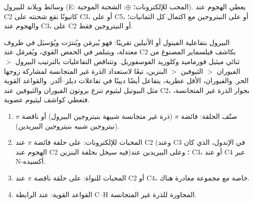\begin{omfigure}

{\small وسائط ويلاند للبيرول (E: المحب للإلكترونات؛ $\oplus$: الشحنة الموجبة).
يعطي الهجوم عند C2 كاتيونًا تقع شحنته على C3، أو على C5، أو على النيتروجين مع اكتمال كل
الثمانيات؛ والهجوم عند C3، على C2 أو النيتروجين فقط.}
\end{omfigure}

البيرول بتفاعلية الفينول أو الأنيلين تقريبًا: فهو يُبرمَن ويُنترَت
ويُؤسيَل في ظروف معتدلة، ويتبلمر في الحمض القوي، 
ويُفرمَل عند C2 بكاشف فيلسماير المصنوع من ثنائي ميثيل فورماميد وكلوريد
الفوسفوريل. وتتناقص التفاعليات بالترتيب البيرول $>$ الفيوران $>$ الثيوفين $>$ البنزين،
تبعًا لاستعداد الذرة غير المتجانسة لمشاركة زوجها الحر. والفيوران،
الأقل عطرية، يتفاعل أيضًا ديينًا في تفاعلات ديلز--ألدر. والقواعد
القوية مثل البيوتيل ليثيوم تنزع بروتون الفيوران والثيوفين عند C2، بجوار
الذرة غير المتجانسة، فتعطي كواشف ليثيوم عضوية.

\begin{method}\label{met:b3:heterocycles:site}
\begin{enumerate}
  \item صنّف الحلقة: فائضة $\pi$ (ذرة غير متجانسة شبيهة بنيتروجين البيرول) أو ناقصة $\pi$
        (نيتروجين شبيه بنيتروجين البيريدين).
  \item المحبات للإلكترونات: على حلقة فائضة $\pi$ عند C2 (وعند C3 في الإندول، الذي كان الهجوم عند C2 فيه
        سيخل بحلقة البنزين)؛ وعلى البيريدين عند C3، أو عند C4 عبر
        N-أكسيده.
  \item المحبات للنواة: على حلقة ناقصة $\pi$ عند C2 أو C4، خاصة مع مجموعة
        مغادرة هناك.
  \item القواعد القوية: عند الرابطة C--H المجاورة للذرة غير المتجانسة.
\end{enumerate}
\end{method}

